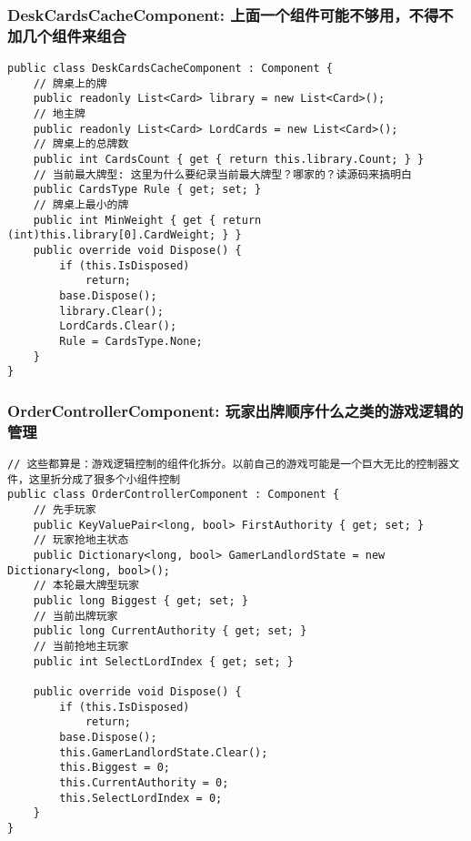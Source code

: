 \documentclass[9pt, b5paper]{article}
\begin{document}
\subsubsection{DeskCardsCacheComponent: 上面一个组件可能不够用，不得不加几个组件来组合}
\label{sec-1-5-2}
\begin{verbatim}
public class DeskCardsCacheComponent : Component {
    // 牌桌上的牌
    public readonly List<Card> library = new List<Card>();
    // 地主牌
    public readonly List<Card> LordCards = new List<Card>();
    // 牌桌上的总牌数
    public int CardsCount { get { return this.library.Count; } }
    // 当前最大牌型: 这里为什么要纪录当前最大牌型？哪家的？读源码来搞明白
    public CardsType Rule { get; set; }
    // 牌桌上最小的牌
    public int MinWeight { get { return (int)this.library[0].CardWeight; } }
    public override void Dispose() {
        if (this.IsDisposed) 
            return;
        base.Dispose();
        library.Clear();
        LordCards.Clear();
        Rule = CardsType.None;
    }
}
\end{verbatim}
\subsubsection{OrderControllerComponent: 玩家出牌顺序什么之类的游戏逻辑的管理}
\label{sec-1-5-3}
\begin{verbatim}
// 这些都算是：游戏逻辑控制的组件化拆分。以前自己的游戏可能是一个巨大无比的控制器文件，这里折分成了狠多个小组件控制
public class OrderControllerComponent : Component {
    // 先手玩家
    public KeyValuePair<long, bool> FirstAuthority { get; set; }
    // 玩家抢地主状态
    public Dictionary<long, bool> GamerLandlordState = new Dictionary<long, bool>();
    // 本轮最大牌型玩家
    public long Biggest { get; set; }
    // 当前出牌玩家
    public long CurrentAuthority { get; set; }
    // 当前抢地主玩家
    public int SelectLordIndex { get; set; }

    public override void Dispose() {
        if (this.IsDisposed) 
            return;
        base.Dispose();
        this.GamerLandlordState.Clear();
        this.Biggest = 0;
        this.CurrentAuthority = 0;
        this.SelectLordIndex = 0;
    }
}
\end{verbatim}
\end{document}
